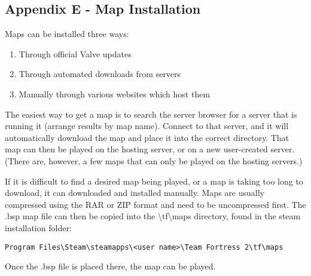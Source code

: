 \subsection{Appendix E - Map Installation}
\label{map_install}
Maps can be installed three ways:
\begin{enumerate}
  \setlength{\itemsep}{1pt}
  \setlength{\parskip}{0pt}
  \setlength{\parsep}{0pt}
  \item Through official Valve updates
  \item Through automated downloads from servers
  \item Manually through various websites which host them
\end{enumerate}


The easiest way to get a map is to search the server browser for a server that is running it (arrange results by map name). Connect to that server, and it will automatically download the map and place it into the correct directory. That map can then be played on the hosting server, or on a new user-created server.  (There are, however, a few maps that can only be played on the hosting servers.)

If it is difficult to find a desired map being played, or a map is taking too long to download, it can downloaded and installed manually. Maps are usually compressed using the RAR or ZIP format and need to be uncompressed first.  The .bsp map file can then be copied into the \textbackslash tf\textbackslash maps directory, found in the steam installation folder:
\begin{lstlisting}
Program Files\Steam\steamapps\<user name>\Team Fortress 2\tf\maps
\end{lstlisting}
Once the .bsp file is placed there, the map can be played.